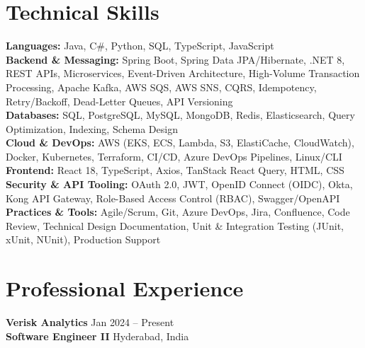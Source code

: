 \documentclass[a4paper,10pt]{article}
\begin{document}
\section*{Technical Skills}
\begin{sloppypar}
\noindent
\textbf{Languages:} Java, C\#, Python, SQL, TypeScript, JavaScript \\
\textbf{Backend \& Messaging:} Spring Boot, Spring Data JPA/Hibernate, .NET 8, REST APIs, Microservices, Event-Driven Architecture, High-Volume Transaction Processing, Apache Kafka, AWS SQS, AWS SNS, CQRS, Idempotency, Retry/Backoff, Dead-Letter Queues, API Versioning \\
\textbf{Databases:} SQL, PostgreSQL, MySQL, MongoDB, Redis, Elasticsearch, Query Optimization, Indexing, Schema Design \\
\textbf{Cloud \& DevOps:} AWS (EKS, ECS, Lambda, S3, ElastiCache, CloudWatch), Docker, Kubernetes, Terraform, CI/CD, Azure DevOps Pipelines, Linux/CLI \\
\textbf{Frontend:} React 18, TypeScript, Axios, TanStack React Query, HTML, CSS \\
\textbf{Security \& API Tooling:} OAuth 2.0, JWT, OpenID Connect (OIDC), Okta, Kong API Gateway, Role-Based Access Control (RBAC), Swagger/OpenAPI \\
\textbf{Practices \& Tools:} Agile/Scrum, Git, Azure DevOps, Jira, Confluence, Code Review, Technical Design Documentation, Unit \& Integration Testing (JUnit, xUnit, NUnit), Production Support
\end{sloppypar}

\section*{Professional Experience}

\textbf{Verisk Analytics} \hfill Jan 2024 -- Present \\
\textbf{Software Engineer II} \hfill Hyderabad, India
\end{document}
